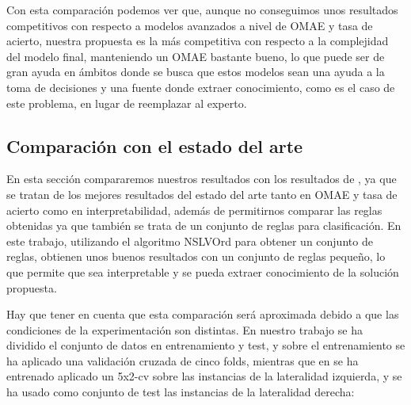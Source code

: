 Con esta comparación podemos ver que, aunque no conseguimos unos resultados competitivos con respecto a modelos avanzados a nivel de OMAE y tasa de acierto, nuestra propuesta es la más competitiva con respecto a la complejidad del modelo final, manteniendo un OMAE bastante bueno, lo que puede ser de gran ayuda en ámbitos donde se busca que estos modelos sean una ayuda a la toma de decisiones y una fuente donde extraer conocimiento, como es el caso de este problema, en lugar de reemplazar al experto.

\newpage

\subsection{Comparación con el estado del arte}

En esta sección compararemos nuestros resultados con los resultados de \cite{NSLVOrdAge}, ya que se tratan de los mejores resultados del estado del arte tanto en OMAE y tasa de acierto como en interpretabilidad, además de permitirnos comparar las reglas obtenidas ya que también se trata de un conjunto de reglas para clasificación. En este trabajo, utilizando el algoritmo NSLVOrd para obtener un conjunto de reglas, obtienen unos buenos resultados con un conjunto de reglas pequeño, lo que permite que sea interpretable y se pueda extraer conocimiento de la solución propuesta.

Hay que tener en cuenta que esta comparación será aproximada debido a que las condiciones de la experimentación son distintas. En nuestro trabajo se ha dividido el conjunto de datos en entrenamiento y test, y sobre el entrenamiento se ha aplicado una validación cruzada de cinco folds, mientras que en \cite{NSLVOrdAge} se ha entrenado aplicado un 5x2-cv sobre las instancias de la lateralidad izquierda, y se ha usado como conjunto de test las instancias de la lateralidad derecha:


